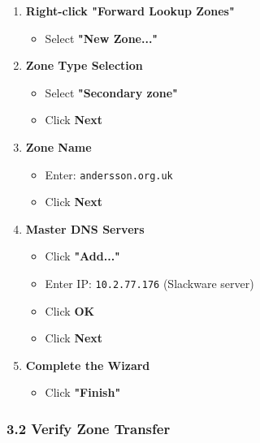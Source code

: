 \begin{enumerate}
\def\labelenumi{\arabic{enumi}.}
\tightlist
\item
  \textbf{Right-click "Forward Lookup Zones"}

  \begin{itemize}
  \tightlist
  \item
    Select \textbf{"New Zone..."}
  \end{itemize}
\item
  \textbf{Zone Type Selection}

  \begin{itemize}
  \tightlist
  \item
    Select \textbf{"Secondary zone"}
  \item
    Click \textbf{Next}
  \end{itemize}
\item
  \textbf{Zone Name}

  \begin{itemize}
  \tightlist
  \item
    Enter: \texttt{andersson.org.uk}
  \item
    Click \textbf{Next}
  \end{itemize}
\item
  \textbf{Master DNS Servers}

  \begin{itemize}
  \tightlist
  \item
    Click \textbf{"Add..."}
  \item
    Enter IP: \texttt{10.2.77.176} (Slackware server)
  \item
    Click \textbf{OK}
  \item
    Click \textbf{Next}
  \end{itemize}
\item
  \textbf{Complete the Wizard}

  \begin{itemize}
  \tightlist
  \item
    Click \textbf{"Finish"}
  \end{itemize}
\end{enumerate}

\subsubsection{3.2 Verify Zone Transfer}\label{verify-zone-transfer-andersson}


